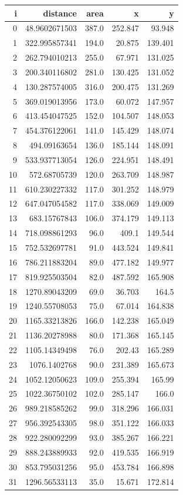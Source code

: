 \documentclass[11pt]{article}
\begin{document}
\begin{center}
\begin{tabular}{rrrrr}
i & distance & area & x & y\\
\hline
0 & 48.9602671503 & 387.0 & 252.847 & 93.948\\
1 & 322.995857341 & 194.0 & 20.875 & 139.401\\
2 & 262.794010213 & 255.0 & 67.971 & 131.025\\
3 & 200.340116802 & 281.0 & 130.425 & 131.052\\
4 & 130.287574005 & 316.0 & 200.475 & 131.269\\
5 & 369.019013956 & 173.0 & 60.072 & 147.957\\
6 & 413.454047525 & 152.0 & 104.507 & 148.053\\
7 & 454.376122061 & 141.0 & 145.429 & 148.074\\
8 & 494.09163654 & 136.0 & 185.144 & 148.091\\
9 & 533.937713054 & 126.0 & 224.951 & 148.491\\
10 & 572.68705739 & 120.0 & 263.709 & 148.987\\
11 & 610.230227332 & 117.0 & 301.252 & 148.979\\
12 & 647.047054582 & 117.0 & 338.069 & 149.009\\
13 & 683.15767843 & 106.0 & 374.179 & 149.113\\
14 & 718.098861293 & 96.0 & 409.1 & 149.544\\
15 & 752.532697781 & 91.0 & 443.524 & 149.841\\
16 & 786.211883204 & 89.0 & 477.182 & 149.977\\
17 & 819.925503504 & 82.0 & 487.592 & 165.908\\
18 & 1270.89043209 & 69.0 & 36.703 & 164.5\\
19 & 1240.55708053 & 75.0 & 67.014 & 164.838\\
20 & 1165.33213826 & 166.0 & 142.238 & 165.049\\
21 & 1136.20278988 & 80.0 & 171.368 & 165.145\\
22 & 1105.14349498 & 76.0 & 202.43 & 165.289\\
23 & 1076.1402768 & 90.0 & 231.389 & 165.673\\
24 & 1052.12050623 & 109.0 & 255.394 & 165.99\\
25 & 1022.36750102 & 102.0 & 285.147 & 166.0\\
26 & 989.218585262 & 99.0 & 318.296 & 166.031\\
27 & 956.392543305 & 98.0 & 351.122 & 166.033\\
28 & 922.280092299 & 93.0 & 385.267 & 166.221\\
29 & 888.243889933 & 92.0 & 419.535 & 166.919\\
30 & 853.795031256 & 95.0 & 453.784 & 166.898\\
31 & 1296.56533113 & 35.0 & 15.671 & 172.814\\
\end{tabular}
\end{center}
\end{document}
